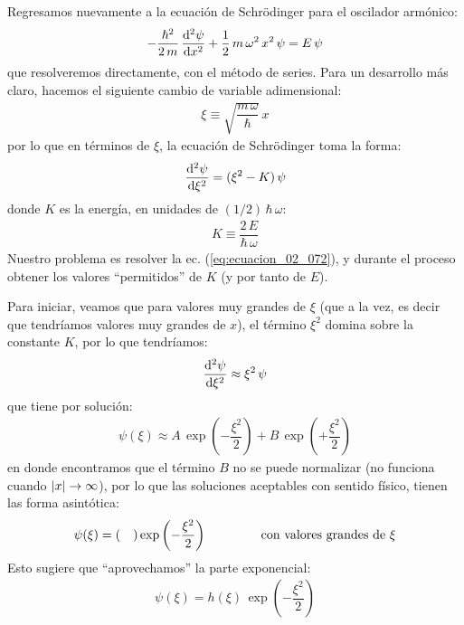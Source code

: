 \documentclass[12pt]{article}
\numberwithin{equation}{section}
\begin{document}
Regresamos nuevamente a la ecuación de Schrödinger para el oscilador armónico:
\begin{align}
- \dfrac{\hbar^{2}}{2 \, m} \, \dv[2]{\psi}{x} + \dfrac{1}{2} \, m \, \omega^{2} \, x^{2} \, \psi = E \, \psi
\label{eq:ecuacion_02_070}
\end{align}
que resolveremos directamente, con el método de series. Para un desarrollo más claro, hacemos el siguiente cambio de variable adimensional:
\begin{align}
\xi \equiv \sqrt{ \dfrac{m \, \omega}{\hbar}} \, x
\label{eq:ecuacion_02_071}
\end{align}
por lo que en términos de $\xi$, la ecuación de Schrödinger toma la forma:
\begin{align}
\dv[2]{\psi}{\xi} = (\xi^{2} - K) \, \psi
\label{eq:ecuacion_02_072}
\end{align}
donde $K$ es la energía, en unidades de $(1/2) \, \hbar \, \omega$:
\begin{align}
K \equiv \dfrac{2 \, E}{\hbar \, \omega}
\label{eq:ecuacion_02_073}
\end{align}
Nuestro problema es resolver la ec. (\ref{eq:ecuacion_02_072}), y durante el proceso obtener los valores \enquote{permitidos} de $K$ (y por tanto de $E$).
\par
Para iniciar, veamos que para valores muy grandes de $\xi$ (que a la vez, es decir que tendríamos valores muy grandes de $x$), el término $\xi^{2}$ domina sobre la constante $K$, por lo que tendríamos:
\begin{align}
\dv[2]{\psi}{\xi} \approx \xi^{2} \, \psi
\label{eq:ecuacion_02_074}
\end{align}
que tiene por solución:
\begin{align}
\psi (\xi) \approx A \, \exp \left( - \dfrac{\xi^{2}}{2} \right) + B \, \exp \left( + \dfrac{\xi^{2}}{2} \right)
\label{eq:ecuacion_02_075}
\end{align}
en donde encontramos que el término $B$ no se puede normalizar (no funciona cuando $\abs{x} \to \infty$), por lo que las soluciones aceptables con sentido físico, tienen las forma asintótica:
\begin{align}
\psi (\xi) = ( \quad ) \exp \left( - \dfrac{\xi^{2}}{2} \right) \hspace{1.5cm} \text{con valores grandes de } \xi
\label{eq:ecuacion_02_076}
\end{align}
Esto sugiere que \enquote{aprovechamos} la parte exponencial:
\begin{align}
\psi (\xi) = h (\xi) \, \exp \left( - \dfrac{\xi^{2}}{2} \right)
\label{eq:ecuacion_02_077}
\end{align}
\end{document}

